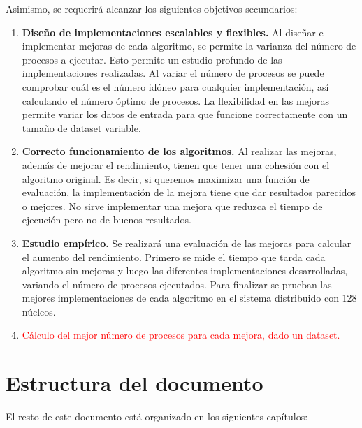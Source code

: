 Asimismo, se requerirá alcanzar los siguientes objetivos secundarios:

\begin{enumerate}
	\item \textbf{Diseño de implementaciones escalables y flexibles.} Al diseñar e implementar mejoras de cada algoritmo, se permite la varianza del número de procesos a ejecutar. Esto permite un estudio profundo de las implementaciones realizadas. Al variar el número de procesos se puede comprobar cuál es el número idóneo para cualquier implementación, así calculando el número óptimo de procesos. La flexibilidad en las mejoras permite variar los datos de entrada para que funcione correctamente con un tamaño de dataset variable.
	\item \textbf{Correcto funcionamiento de los algoritmos.} Al realizar las mejoras, además de mejorar el rendimiento, tienen que tener una cohesión con el algoritmo original. Es decir, si queremos maximizar una función de evaluación, la implementación de la mejora tiene que dar resultados parecidos o mejores. No sirve implementar una mejora que reduzca el tiempo de ejecución pero no de buenos resultados.
	\item \textbf{Estudio empírico.} Se realizará una evaluación de las mejoras para calcular el aumento del rendimiento. Primero se mide el tiempo que tarda cada algoritmo sin mejoras y luego las diferentes implementaciones desarrolladas, variando el número de procesos ejecutados. Para finalizar se prueban las mejores implementaciones de cada algoritmo en el sistema distribuido con 128 núcleos.
	\item \textcolor{red}{Cálculo del mejor número de procesos para cada mejora, dado un dataset.}
\end{enumerate}





\section{Estructura del documento}
El resto de este documento está organizado en los siguientes capítulos:


